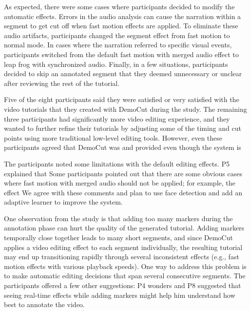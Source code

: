  As expected, there were some cases where
participants decided to modify the automatic effects. Errors in the audio analysis can cause the narration within a
segment to get cut off when fast motion effects are applied.  To eliminate these
audio artifacts, participants changed the segment effect from fast
motion to normal mode. In cases where the narration referred to
specific visual events, participants switched from the default fast
motion with merged audio effect to leap frog with synchronized
audio. Finally, in a few situations, participants decided to skip an
annotated segment that they deemed unnecessary or unclear after
reviewing the rest of the tutorial.

 Five of the eight
participants said they were satisfied or very satisfied with the video
tutorials that they created with DemoCut during the study.
The remaining three participants had significantly more video
editing experience, and they wanted to further refine their tutorials
by adjusting some of the timing and cut points using more traditional
low-level editing tools.
%
However, even these participants agreed that DemoCut was
 and provided  even though the system is 

 The participants noted some limitations
with the default editing effects. P5 explained that  Some
participants pointed out that there are some obvious cases where fast
motion with merged audio should not be applied; for example, the
effect  We agree with
these comments and plan to use face detection and add an adaptive learner to
improve the system.

 One observation from the study is that
adding too many markers during the annotation phase can hurt the
quality of the generated tutorial. Adding markers temporally close together leads to many short
segments, and since DemoCut applies a video editing effect to each segment
individually, the resulting tutorial may end up transitioning rapidly
through several inconsistent effects (e.g., fast motion effects with
various playback speeds). One way to address this problem is to make
automatic editing decisions that span several consecutive segments. The
participants offered a few other suggestions: P4 wonders  and P8 suggested that seeing
real-time effects while adding markers might help him
understand how best to annotate the video.
